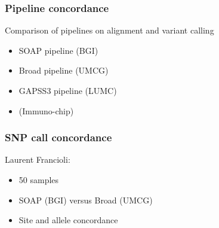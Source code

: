 \documentclass[slidestop,14pt]{beamer}
\begin{document}
\begin{frame}
  \frametitle{Pipeline concordance}

  \vspace{\baselineskip}

  Comparison of pipelines on alignment and variant calling

  \vspace{\baselineskip}

  \begin{itemize}
    \item SOAP pipeline (BGI)
    \item Broad pipeline (UMCG)
    \item GAPSS3 pipeline (LUMC)
    \item (Immuno-chip)
  \end{itemize}
\end{frame}

\begin{frame}
  \frametitle{SNP call concordance}

  \vspace{\baselineskip}

  Laurent Francioli:
  \begin{itemize}
    \item 50 samples
    \item SOAP (BGI) versus Broad (UMCG)
    \item Site and allele concordance
  \end{itemize}
\end{frame}

{
  \frame{}
}
\end{document}
